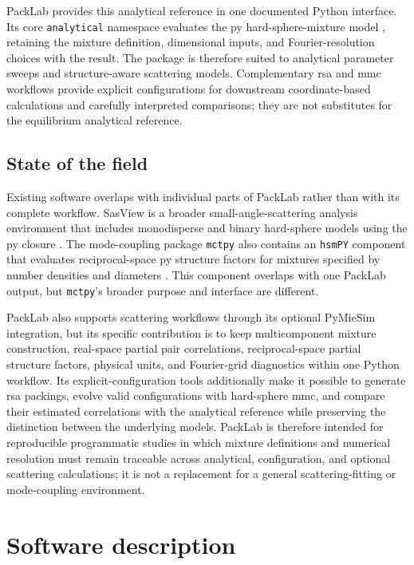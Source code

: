 \documentclass[preprint,12pt]{elsarticle}
\begin{document}
PackLab provides this analytical reference in one documented Python interface. %
Its core \texttt{analytical} namespace evaluates the \gls{py} hard-sphere-mixture model \cite{Percus1958,Lebowitz1964}, retaining the mixture definition, dimensional inputs, and Fourier-resolution choices with the result. %
The package is therefore suited to analytical parameter sweeps and structure-aware scattering models. %
Complementary \gls{rsa} and \gls{mmc} workflows provide explicit configurations for downstream coordinate-based calculations and carefully interpreted comparisons; they are not substitutes for the equilibrium analytical reference. %

\subsection{State of the field}

Existing software overlaps with individual parts of PackLab rather than with its complete workflow. %
SasView is a broader small-angle-scattering analysis environment that includes
monodisperse and binary hard-sphere models using the \gls{py} closure
\cite{SasViewHardSphere,SasViewBinaryHardSphere}. %
The mode-coupling package \texttt{mctpy} also contains an \texttt{hsmPY} component that evaluates reciprocal-space \gls{py} structure factors for mixtures specified by number densities and diameters \cite{MctpyStructureFactors}. %
This component overlaps with one PackLab output, but \texttt{mctpy}'s broader purpose and interface are different. %

PackLab also supports scattering workflows through its optional PyMieSim
integration, but its specific contribution is to keep multicomponent mixture
construction, real-space partial pair correlations, reciprocal-space partial
structure factors, physical units, and Fourier-grid diagnostics within one
Python workflow. %
Its explicit-configuration tools additionally make it possible to generate \gls{rsa} packings, evolve valid configurations with hard-sphere \gls{mmc}, and compare their estimated correlations with the analytical reference while preserving the distinction between the underlying models. %
PackLab is therefore intended for reproducible programmatic studies in which mixture definitions and numerical resolution must remain traceable across analytical, configuration, and optional scattering calculations; it is not a replacement for a general scattering-fitting or mode-coupling environment. %

\FloatBarrier
\section{Software description}
\end{document}
